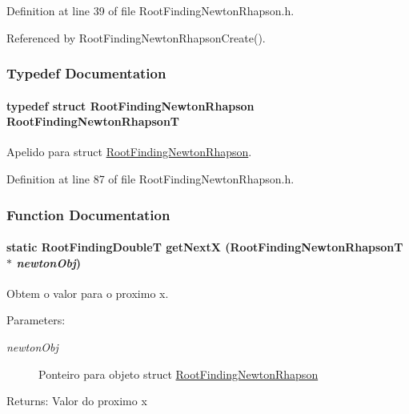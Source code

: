 Definition at line 39 of file RootFindingNewtonRhapson.h.

Referenced by RootFindingNewtonRhapsonCreate().

\subsubsection{Typedef Documentation}
\hypertarget{group____newton_gf707b2eac68bcf9d277d812da5ac380a}{
\paragraph[RootFindingNewtonRhapsonT]{\setlength{\rightskip}{0pt plus 5cm}typedef struct {\bf RootFindingNewtonRhapson} {\bf RootFindingNewtonRhapsonT}}\hfill}
\label{group____newton_gf707b2eac68bcf9d277d812da5ac380a}


Apelido para struct \hyperlink{structRootFindingNewtonRhapson}{RootFindingNewtonRhapson}. 



Definition at line 87 of file RootFindingNewtonRhapson.h.

\subsubsection{Function Documentation}
\hypertarget{group____newton_gf3686b9647cf53686b267e45dc9ecd1e}{
\paragraph[getNextX]{\setlength{\rightskip}{0pt plus 5cm}static {\bf RootFindingDoubleT} getNextX ({\bf RootFindingNewtonRhapsonT} $\ast$ {\em newtonObj})}\hfill}
\label{group____newton_gf3686b9647cf53686b267e45dc9ecd1e}


Obtem o valor para o proximo x. 

\begin{Desc}
\item[Parameters:]
\begin{description}
\item[{\em newtonObj}]Ponteiro para objeto struct \hyperlink{structRootFindingNewtonRhapson}{RootFindingNewtonRhapson} \end{description}
\end{Desc}
\begin{Desc}
\item[Returns:]Valor do proximo x \end{Desc}



